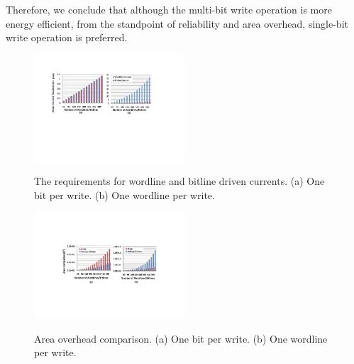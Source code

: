 Therefore, we conclude that although the multi-bit write operation is more
energy efficient, from the standpoint of reliability and area overhead,
single-bit write operation is preferred.
\begin{figure}%
\centering
  \includegraphics[width=0.5\textwidth]{./figures/drive_i_f.pdf}\\
  \caption{The requirements for wordline and bitline driven currents. (a) One bit per write. (b) One wordline per write.}\label{fig:drive_i}
\end{figure}



\begin{figure}%
\centering
  \includegraphics[width=0.5\textwidth]{./figures/area_comp_f1.pdf}\\
  \caption{Area overhead comparison. (a) One bit per write. (b) One wordline per write.}\label{fig:area_i}
\vspace{-10pt}
\end{figure}

%
%

